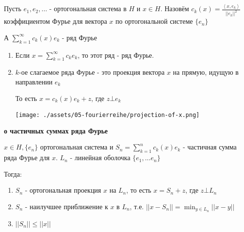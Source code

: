 \begin{definition}
    Пусть $e_1, e_2, \ldots$ - ортогональная система в $H$ и $x \in H$. Назовём $c_k (x) = \frac{\left < x, e_k \right >}{||e_k||^2}$ коэффициентом Фурье для вектора $x$ по ортогональной системе $\{ e_n \}$

    А $\sum_{k = 1}^\infty c_k (x) e_k $ - ряд Фурье
\end{definition}

\begin{remark}
    \begin{enumerate}
        \item {
            Если $x = \sum_{k = 1}^\infty c_k e_k$, то этот ряд - ряд Фурье.
        }
        \item {
            $k$-ое слагаемое ряда Фурье - это проекция вектора $x$ на прямую, идущую в направлении $e_k$

            То есть $x = c_k(x) e_k + z$, где $z \bot e_k$

            \begin{center}
                \texttt{[image: ./assets/05-fourierreihe/projection-of-x.png]}
            \end{center}
        }
    \end{enumerate}
\end{remark}

\begin{theorem}
    \textbf{о частичных суммах ряда Фурье}

    $x \in H, \{ e_n \}$ ортогональная система и $S_n = \sum_{k = 1}^n c_k (x) e_k $ - частичная сумма ряда Фурье для $x$.
    $L_n$ - линейная оболочка $\{ e_1, \ldots e_n \}$

    Тогда:
    \begin{enumerate}
        \item $S_n$ - ортогональная проекция $x$ на $L_n$, то есть $x = S_n + z$, где $z \bot L_n$
        \item $S_n$ - наилучшее приближение к $x$ в $L_n$, т.е. $||x - S_n|| = \min_{y \in L_n} ||x - y||$
        \item $||S_n|| \leqslant ||x||$
    \end{enumerate}

\end{theorem}

